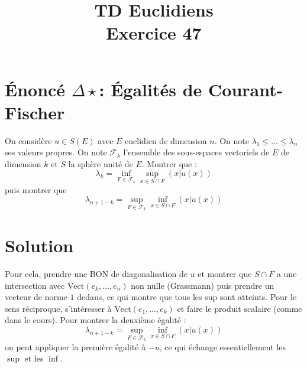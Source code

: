 \documentclass[french]{article}
\title{TD Euclidiens\\ Exercice 47}
\date{}
\begin{document}
\maketitle

\section{Énoncé $\Delta\star$: Égalités de Courant-Fischer}
On considère $u\in S(E)$ avec $E$ euclidien de dimension $n$. On note $\lambda_1\leqslant\ldots\leqslant\lambda_n$ ses valeurs propres. On note $\mathcal{F}_k$ l'ensemble des sous-espaces vectoriels de $E$ de dimension $k$ et $S$ la sphère unité de $E$. Montrer que :  $$\lambda_k=\inf_{F\in\mathcal{F}_k}\sup_{x\in S\cap F}(x|u(x))$$ puis montrer que $$\lambda_{n+1-k}=\sup_{F\in\mathcal{F}_k}\inf_{x\in S\cap F}(x|u(x))$$
\section{Solution}
Pour cela, prendre une BON de diagonalisation de $u$ et montrer que $S\cap F$ a une intersection avec $\text{Vect}(e_k,\ldots,e_n)$ non nulle (Grassmann) puis prendre un vecteur de norme $1$ dedans, ce qui montre que tous les sup sont atteints. Pour le sens réciproque, s'intéresser à $\text{Vect}(e_1,\ldots,e_k)$ et faire le produit scalaire (comme dans le cours). Pour montrer la deuxième égalité : $$\lambda_{n+1-k}=\sup_{F\in \mathcal{F}_k}\inf_{x\in S\cap F}(x|u(x))$$ on peut appliquer la première égalité à $-u$, ce qui échange essentiellement les $\sup$ et les $\inf$.
\end{document}

